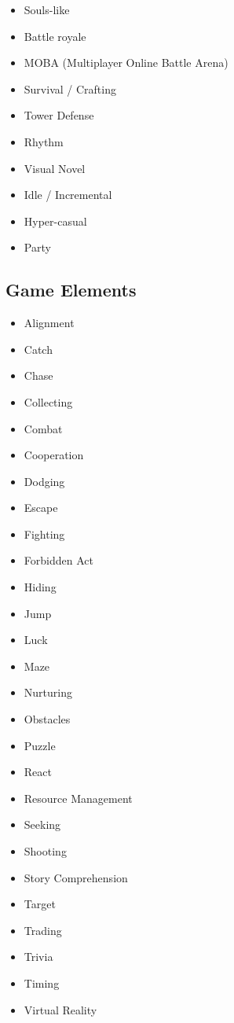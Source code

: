 \begin{itemize}[label=\textbullet]
\begin{itemize}[label=$\circ$]
    \item Souls-like
    \item Battle royale
    \item MOBA (Multiplayer Online Battle Arena)
    \item Survival / Crafting
    \item Tower Defense
    \item Rhythm
    \item Visual Novel
    \item Idle / Incremental
    \item Hyper-casual
    \item Party
  \end{itemize}
\end{itemize}

\subsection{Game Elements}

\begin{itemize}[label=\textbullet]
  \item Alignment
  \item Catch
  \item Chase
  \item Collecting
  \item Combat
  \item Cooperation
  \item Dodging
  \item Escape
  \item Fighting
  \item Forbidden Act
  \item Hiding
  \item Jump
  \item Luck
  \item Maze
  \item Nurturing
  \item Obstacles
  \item Puzzle
  \item React
  \item Resource Management
  \item Seeking
  \item Shooting
  \item Story Comprehension
  \item Target
  \item Trading
  \item Trivia
  \item Timing
  \item Virtual Reality
\end{itemize}

